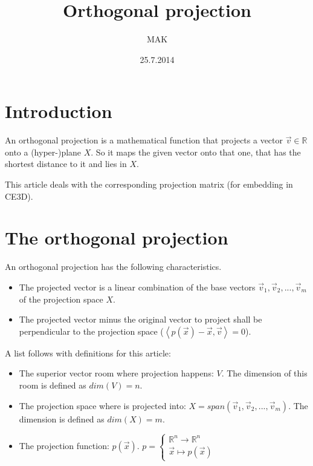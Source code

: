 \documentclass{article}
\newcommand{\lrangle}[1]{\left\langle #1 \right\rangle}
\begin{document}
\title{Orthogonal projection}
\author{MAK}
\date{25.7.2014}


\maketitle






\section{Introduction}

An orthogonal projection is a mathematical function that projects a vector \(\vec{v}\in\mathbb{R}\)
onto a (hyper-)plane \(X\). So it maps the given vector onto that one, that has the shortest
distance to it and lies in \(X\).

This article deals with the corresponding projection matrix (for embedding in CE3D).






\section{The orthogonal projection}

An orthogonal projection has the following characteristics.

	\begin{itemize}
		\item The projected vector is a linear combination of the base vectors
		      \(\vec{v}_1,\vec{v}_2,...,\vec{v}_m\) of the projection space \(X\).
		\item The projected vector minus the original vector to project shall be
		      perpendicular to the projection space (\(\lrangle{ p(\vec{x})-\vec{x},\vec{v} } =0\)).
	\end{itemize}

A list follows with definitions for this article:

	\begin{itemize}
		\item The superior vector room where projection happens: \(V\). The dimension of
		      this room is defined as \(dim(V)=n\).
		\item The projection space where is projected into:
		      \(X=span(\vec{v}_1,\vec{v}_2,...,\vec{v}_m)\). The dimension is defined as
		      \(dim(X)=m\).
		\item The projection function: \(p(\vec{x})\).
		      \(p = \left\{\begin{array}{l}\mathbb{R}^n\to \mathbb{R}^n\\\vec{x}\mapsto
		      p(\vec{x})\end{array} \right.\)
	\end{itemize}
\end{document}
